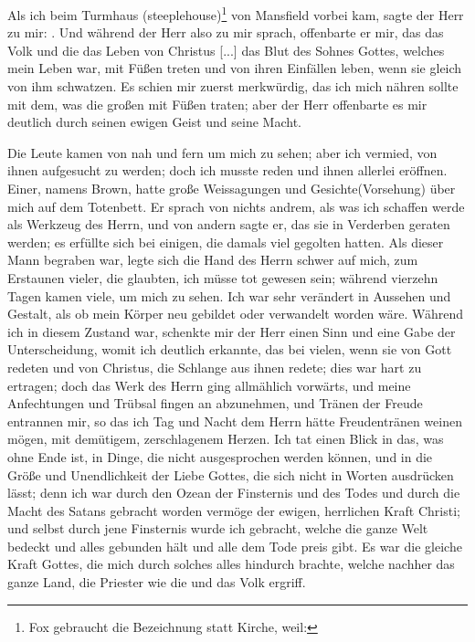 Als ich beim Turmhaus (steeplehouse)\footnote{Fox gebraucht 
die Bezeichnung  statt Kirche, weil: } von Mansfield vorbei kam, sagte 
der Herr zu mir: . Und während der Herr also
zu mir sprach, offenbarte er mir, das das Volk und die 
das Leben von Christus [...] das Blut des Sohnes Gottes, welches
mein Leben war, mit Füßen treten und von ihren Einfällen leben,
wenn sie gleich von ihm schwatzen. Es schien mir zuerst 
merkwürdig, das ich mich nähren sollte mit dem, was die großen
 mit Füßen traten; aber der Herr offenbarte es mir
deutlich durch seinen ewigen Geist und seine Macht.

Die Leute kamen von nah und fern um mich zu sehen;
aber ich vermied, von ihnen aufgesucht zu werden; doch ich musste
reden und ihnen allerlei eröffnen. Einer, namens Brown, hatte
große Weissagungen und Gesichte(Vorsehung) über mich auf dem Totenbett.
Er sprach von nichts andrem, als was ich schaffen werde als
Werkzeug des Herrn, und von andern sagte er, das sie in 
Verderben geraten werden; es erfüllte sich bei einigen, die damals
viel gegolten hatten. Als dieser Mann begraben war, legte sich
die Hand des Herrn schwer auf mich, zum Erstaunen vieler, die
glaubten, ich müsse tot gewesen sein; während vierzehn Tagen
kamen viele, um mich zu sehen. Ich war sehr verändert in 
Aussehen und Gestalt, als ob mein Körper neu gebildet oder 
verwandelt worden wäre. Während ich in diesem Zustand war,
schenkte mir der Herr einen Sinn und eine Gabe der 
Unterscheidung, womit ich deutlich erkannte, das bei vielen, wenn sie
von Gott redeten und von Christus, die Schlange aus ihnen redete;
dies war hart zu ertragen; doch das Werk des Herrn ging 
allmählich vorwärts, und meine Anfechtungen und Trübsal fingen
an abzunehmen, und Tränen der Freude entrannen mir, so das
ich Tag und Nacht dem Herrn hätte Freudentränen weinen mögen,
mit demütigem, zerschlagenem Herzen. Ich tat einen Blick in das,
was ohne Ende ist, in Dinge, die nicht ausgesprochen werden
können, und in die Größe und Unendlichkeit der Liebe Gottes,
die sich nicht in Worten ausdrücken lässt; denn ich war durch
den Ozean der Finsternis und des Todes und durch die Macht
des Satans gebracht worden vermöge der ewigen, herrlichen Kraft
Christi; und selbst durch jene Finsternis wurde ich gebracht, welche
die ganze Welt bedeckt und alles gebunden hält und alle dem Tode
preis gibt. Es war die gleiche Kraft Gottes, die mich durch
solches alles hindurch brachte, welche nachher das ganze Land,
die Priester wie die  und das Volk ergriff.

